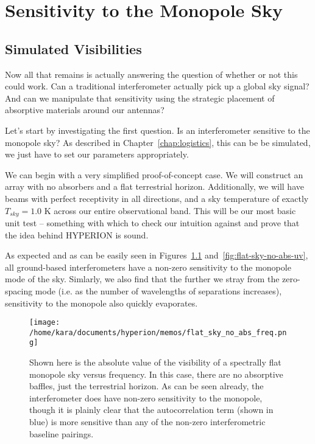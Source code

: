 \chapter{Sensitivity to the Monopole Sky}

\section{Simulated Visibilities}

Now all that remains is actually answering the question of whether or not this 
could work.  Can a traditional interferometer actually pick up a global sky 
signal?  And can we manipulate that sensitivity using the strategic placement 
of absorptive materials around our antennas?

Let's start by investigating the first question. Is an interferometer sensitive 
to the monopole sky? As described in Chapter~\ref{chap:logistics}, this can be 
be simulated, we just have to set our parameters appropriately.

We can begin with a very simplified proof-of-concept case. We will construct an 
array with no absorbers and a flat terrestrial horizon. Additionally, we will 
have beams with perfect receptivity in all directions, and a sky temperature of 
exactly $T_{sky} = 1.0$ K across our entire observational band. This will be 
our most basic unit test -- something with which to check our intuition against 
and prove that the idea behind HYPERION is sound.

As expected and  as can be easily seen in 
Figures~\ref{fig:flat-sky-no-abs-freq} and~\ref{fig:flat-sky-no-abs-uv}, all 
ground-based interferometers have a non-zero sensitivity to the monopole mode 
of the sky. Simlarly, we also find that the further we stray from the 
zero-spacing mode (i.e. as the number of wavelengths of separations increases), 
sensitivity to the monopole also quickly evaporates.

\begin{figure}
    \begin{center}
    \texttt{[image: /home/kara/documents/hyperion/memos/flat\_sky\_no\_abs\_freq.png]}
    \end{center}
    \caption{
        Shown here is the absolute value of the visibility of a spectrally flat 
        monopole sky versus frequency. In this case, there are no absorptive 
        baffles, just the terrestrial horizon. As can be seen already, the 
        interferometer does have non-zero sensitivity to the monopole, though 
        it is plainly clear that the autocorrelation term (shown in blue) is 
        more sensitive than any of the non-zero interferometric baseline 
        pairings.
    }
    \label{fig:flat-sky-no-abs-freq}
\end{figure}

